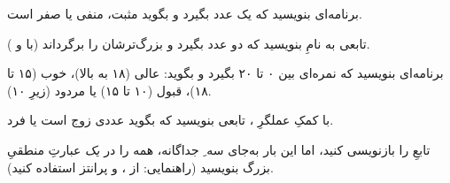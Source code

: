 \exercise برنامه‌ای بنویسید که یک عدد بگیرد و بگوید مثبت، منفی یا صفر است.

\exercise تابعی به نامِ  بنویسید که دو عدد بگیرد و بزرگ‌ترشان را
برگرداند (با  و ).

\exercise برنامه‌ای بنویسید که نمره‌ای بین ۰ تا ۲۰ بگیرد و بگوید: عالی (۱۸ به
بالا)، خوب (۱۵ تا ۱۸)، قبول (۱۰ تا ۱۵) یا مردود (زیرِ ۱۰).

\exercise با کمکِ عملگرِ \code{\%}، تابعی بنویسید که بگوید عددی زوج است یا فرد.

\exercise تابعِ  را بازنویسی کنید، اما این بار به‌جای سه
ِ جداگانه، همه را در \emph{یک} عبارتِ منطقیِ بزرگ بنویسید (راهنمایی:
از ،  و پرانتز استفاده کنید).
